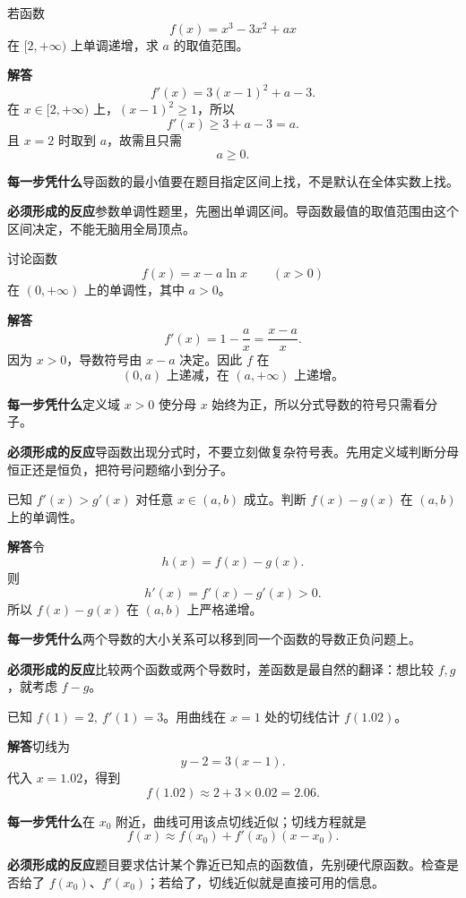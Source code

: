 \documentclass[11pt,fontset=fandol]{ctexart}
\newcommand{\answer}{\par\textbf{解答}\quad}
\newcommand{\basis}{\par\textbf{每一步凭什么}\quad}
\newcommand{\reaction}{\par\textbf{必须形成的反应}\quad}
\newenvironment{drill}[2]{
  \begin{tcolorbox}[colback=white,colframe=black!35,title={#1\quad\small #2},breakable]
}{\end{tcolorbox}}
\begin{document}
\begin{drill}{49. “在某区间递增”不要求导函数在全体实数非负}{项目导数题库改编}
若函数
\[
f(x)=x^3-3x^2+ax
\]
在 $[2,+\infty)$ 上单调递增，求 $a$ 的取值范围。

\answer
\[
f'(x)=3(x-1)^2+a-3.
\]
在 $x\in[2,+\infty)$ 上，$(x-1)^2\ge1$，所以
\[
f'(x)\ge3+a-3=a.
\]
且 $x=2$ 时取到 $a$，故需且只需
\[
a\ge0.
\]

\basis 导函数的最小值要在题目指定区间上找，不是默认在全体实数上找。

\reaction 参数单调性题里，先圈出单调区间。导函数最值的取值范围由这个区间决定，不能无脑用全局顶点。
\end{drill}

\begin{drill}{50. 对数函数求导后的分母永远为正}{项目导数题库改编}
讨论函数
\[
f(x)=x-a\ln x\qquad(x>0)
\]
在 $(0,+\infty)$ 上的单调性，其中 $a>0$。

\answer
\[
f'(x)=1-\frac ax=\frac{x-a}{x}.
\]
因为 $x>0$，导数符号由 $x-a$ 决定。因此 $f$ 在
\[
(0,a)\text{ 上递减，在 }(a,+\infty)\text{ 上递增。}
\]

\basis 定义域 $x>0$ 使分母 $x$ 始终为正，所以分式导数的符号只需看分子。

\reaction 导函数出现分式时，不要立刻做复杂符号表。先用定义域判断分母恒正还是恒负，把符号问题缩小到分子。
\end{drill}

\begin{drill}{51. 导数比较可转化为函数增减比较}{人教B版导数概念题型改编}
已知 $f'(x)>g'(x)$ 对任意 $x\in(a,b)$ 成立。判断 $f(x)-g(x)$ 在 $(a,b)$ 上的单调性。

\answer 令
\[
h(x)=f(x)-g(x).
\]
则
\[
h'(x)=f'(x)-g'(x)>0.
\]
所以 $f(x)-g(x)$ 在 $(a,b)$ 上严格递增。

\basis 两个导数的大小关系可以移到同一个函数的导数正负问题上。

\reaction 比较两个函数或两个导数时，差函数是最自然的翻译：想比较 $f,g$，就考虑 $f-g$。
\end{drill}

\begin{drill}{52. 已知函数值和导数值时的切线近似}{人教B版导数应用题型改编}
已知 $f(1)=2,\ f'(1)=3$。用曲线在 $x=1$ 处的切线估计 $f(1.02)$。

\answer 切线为
\[
y-2=3(x-1).
\]
代入 $x=1.02$，得到
\[
f(1.02)\approx2+3\times0.02=2.06.
\]

\basis 在 $x_0$ 附近，曲线可用该点切线近似；切线方程就是
\[
f(x)\approx f(x_0)+f'(x_0)(x-x_0).
\]

\reaction 题目要求估计某个靠近已知点的函数值，先别硬代原函数。检查是否给了 $f(x_0)$、$f'(x_0)$；若给了，切线近似就是直接可用的信息。
\end{drill}
\end{document}
